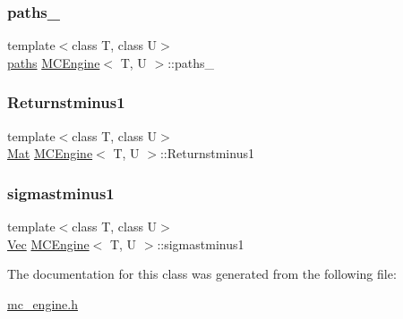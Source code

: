 \hypertarget{classMCEngine_a138035de4a3c8e088c437da6d6079ded}{}\label{classMCEngine_a138035de4a3c8e088c437da6d6079ded} 
\subsubsection{\texorpdfstring{paths\+\_\+}{paths\_}}
{\footnotesize\ttfamily template$<$class T, class U$>$ \\
\hyperlink{classMCEngine_a977f1048508a1467c496c2c47231d1d3}{paths} \hyperlink{classMCEngine}{M\+C\+Engine}$<$ T, U $>$\+::paths\+\_\+\hspace{0.3cm}{\ttfamily [protected]}}

\hypertarget{classMCEngine_a74547ec91afe270f4b0efc13048852dc}{}\label{classMCEngine_a74547ec91afe270f4b0efc13048852dc} 
\subsubsection{\texorpdfstring{Returnstminus1}{Returnstminus1}}
{\footnotesize\ttfamily template$<$class T, class U$>$ \\
\hyperlink{compute__returns__eigen_8h_ae14dd28696f743e067dbd2594616bad6}{Mat} \hyperlink{classMCEngine}{M\+C\+Engine}$<$ T, U $>$\+::Returnstminus1\hspace{0.3cm}{\ttfamily [protected]}}

\hypertarget{classMCEngine_afbebad3416f7c4eb6527497d19366f82}{}\label{classMCEngine_afbebad3416f7c4eb6527497d19366f82} 
\subsubsection{\texorpdfstring{sigmastminus1}{sigmastminus1}}
{\footnotesize\ttfamily template$<$class T, class U$>$ \\
\hyperlink{compute__returns__eigen_8h_a1eb6a9306ef406d7975f3cbf2e247777}{Vec} \hyperlink{classMCEngine}{M\+C\+Engine}$<$ T, U $>$\+::sigmastminus1\hspace{0.3cm}{\ttfamily [protected]}}



The documentation for this class was generated from the following file\+:\begin{DoxyCompactItemize}
\item 
\hyperlink{mc__engine_8h}{mc\+\_\+engine.\+h}\end{DoxyCompactItemize}
